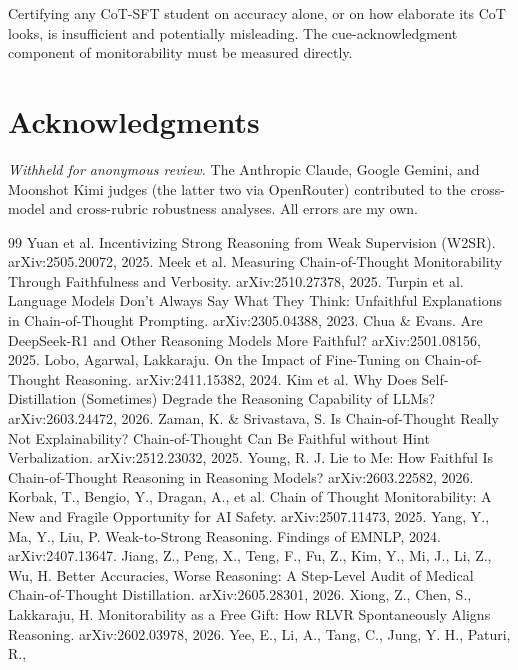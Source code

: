 \documentclass{article}
\begin{document}
Certifying any CoT-SFT student on accuracy alone, or on how elaborate its CoT
looks, is insufficient and potentially misleading. The cue-acknowledgment
component of monitorability must be measured directly.

\section*{Acknowledgments}

\emph{Withheld for anonymous review.} The Anthropic Claude, Google Gemini, and Moonshot Kimi judges
(the latter two via OpenRouter) contributed to the cross-model and
cross-rubric robustness analyses. All errors are my own.

\begin{thebibliography}{99}\small
{} Yuan et al. Incentivizing Strong Reasoning from Weak
Supervision (W2SR). arXiv:2505.20072, 2025.
 Meek et al. Measuring Chain-of-Thought Monitorability
Through Faithfulness and Verbosity. arXiv:2510.27378, 2025.
 Turpin et al. Language Models Don't Always Say What They
Think: Unfaithful Explanations in Chain-of-Thought Prompting.
arXiv:2305.04388, 2023.
 Chua \& Evans. Are DeepSeek-R1 and Other Reasoning Models
More Faithful? arXiv:2501.08156, 2025.
 Lobo, Agarwal, Lakkaraju. On the Impact of Fine-Tuning on
Chain-of-Thought Reasoning. arXiv:2411.15382, 2024.
 Kim et al. Why Does Self-Distillation (Sometimes)
Degrade the Reasoning Capability of LLMs? arXiv:2603.24472, 2026.
 Zaman, K. \& Srivastava, S. Is Chain-of-Thought Really Not
Explainability? Chain-of-Thought Can Be Faithful without Hint Verbalization.
arXiv:2512.23032, 2025.
 Young, R. J. Lie to Me: How Faithful Is
Chain-of-Thought Reasoning in Reasoning Models? arXiv:2603.22582, 2026.
 Korbak, T., Bengio, Y., Dragan, A., et al. Chain of
Thought Monitorability: A New and Fragile Opportunity for AI Safety.
arXiv:2507.11473, 2025.
 Yang, Y., Ma, Y., Liu, P. Weak-to-Strong Reasoning.
Findings of EMNLP, 2024. arXiv:2407.13647.
 Jiang, Z., Peng, X., Teng, F., Fu, Z., Kim, Y.,
Mi, J., Li, Z., Wu, H. Better Accuracies, Worse Reasoning: A Step-Level
Audit of Medical Chain-of-Thought Distillation. arXiv:2605.28301, 2026.
 Xiong, Z., Chen, S., Lakkaraju, H.
Monitorability as a Free Gift: How RLVR Spontaneously Aligns Reasoning.
arXiv:2602.03978, 2026.
 Yee, E., Li, A., Tang, C., Jung, Y. H., Paturi, R.,

\end{thebibliography}
\end{document}
